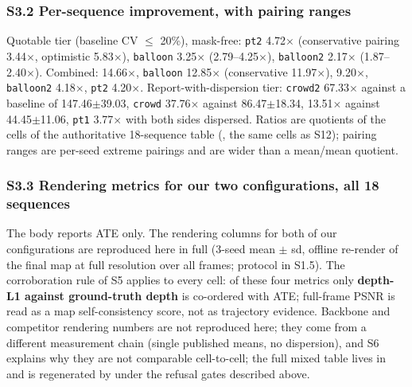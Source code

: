 \subsubsection{S3.2 Per-sequence improvement, with pairing ranges}


Quotable tier (baseline CV $\le$ 20\%), mask-free: \texttt{pt2} 4.72$\times$ (conservative pairing 3.44$\times$, optimistic 5.83$\times$), \texttt{balloon} 3.25$\times$ (2.79--4.25$\times$), \texttt{balloon2} 2.17$\times$ (1.87--2.40$\times$). Combined:  14.66$\times$, \texttt{balloon} 12.85$\times$ (conservative 11.97$\times$),  9.20$\times$, \texttt{balloon2} 4.18$\times$, \texttt{pt2} 4.20$\times$. Report-with-dispersion tier: \texttt{crowd2} 67.33$\times$ against a baseline of 147.46$\pm$39.03, \texttt{crowd} 37.76$\times$ against 86.47$\pm$18.34,  13.51$\times$ against 44.45$\pm$11.06, \texttt{pt1} 3.77$\times$ with both sides dispersed. Ratios are quotients of the cells of the authoritative 18-sequence table (, the same cells as S12); pairing ranges are per-seed extreme pairings and are wider than a mean/mean quotient.


\subsubsection{S3.3 Rendering metrics for our two configurations, all 18 sequences}


The body reports ATE only. The rendering columns for both of our configurations are reproduced here in full (3-seed mean $\pm$ sd, offline re-render of the final map at full resolution over all frames; protocol in S1.5). The corroboration rule of S5 applies to every cell: of these four metrics only \textbf{depth-L1 against ground-truth depth} is co-ordered with ATE; full-frame PSNR is read as a map self-consistency score, not as trajectory evidence. Backbone and competitor rendering numbers are not reproduced here; they come from a different measurement chain (single published means, no dispersion), and S6 explains why they are not comparable cell-to-cell; the full mixed table lives in  and is regenerated by  under the refusal gates described above.


